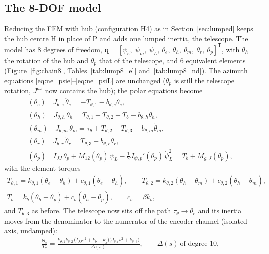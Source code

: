 \documentclass[10pt,a4paper]{article}
\numberwithin{equation}{section}
\begin{document}
\subsection{The 8-DOF model}\label{subsec:8dof}
Reducing the FEM with hub (configuration H4) as in Section~\ref{sec:lumped} keeps the hub centre H in place of P and adds one lumped inertia, the telescope. The model has 8 degrees of freedom, $\mathbf q = [\psi_e,\ \psi_m,\ \psi_L,\ \theta_e,\ \theta_h,\ \theta_m,\ \theta_r,\ \theta_p]^{\mathsf T}$, with $\theta_h$ the rotation of the hub and $\theta_p$ that of the telescope, and 6 equivalent elements (Figure~\ref{fig:chain8}, Tables~\ref{tab:lump8_el} and~\ref{tab:lump8_nd}). The azimuth equations \eqref{eq:ne_psie}--\eqref{eq:ne_psiL} are unchanged ($\theta_p$ is still the telescope rotation, $J^{ax}$ now contains the hub); the polar equations become
\begin{gather}
(\theta_e)\quad J_{\theta,e}\,\ddot\theta_e = -T_{\theta,1} - b_{\theta,e}\dot\theta_e,\\
(\theta_h)\quad J_{\theta,h}\,\ddot\theta_h = T_{\theta,1} - T_{\theta,2} - T_b - b_{\theta,h}\dot\theta_h,\\
(\theta_m)\quad J_{\theta,m}\,\ddot\theta_m = \tau_\theta + T_{\theta,2} - T_{\theta,3} - b_{\theta,m}\dot\theta_m,\\
(\theta_r)\quad J_{\theta,r}\,\ddot\theta_r = T_{\theta,3} - b_{\theta,r}\dot\theta_r,\\
(\theta_p)\quad I_{JJ}\,\ddot\theta_p + M_{12}(\theta_p)\,\ddot\psi_L - \tfrac12 J_{\psi,p}'(\theta_p)\,\dot\psi_L^2 = T_b + M_{g,J}(\theta_p),
\end{gather}
with the element torques
\begin{gather}
T_{\theta,1} = k_{\theta,1}(\theta_e - \theta_h) + c_{\theta,1}(\dot\theta_e - \dot\theta_h),\qquad T_{\theta,2} = k_{\theta,2}(\theta_h - \theta_m) + c_{\theta,2}(\dot\theta_h - \dot\theta_m),\\
T_b = k_b(\theta_h - \theta_p) + c_b(\dot\theta_h - \dot\theta_p),\qquad c_b = \beta k_b,
\end{gather}
and $T_{\theta,3}$ as before. The telescope now sits off the path $\tau_\theta\to\theta_e$ and its inertia moves from the denominator to the numerator of the encoder channel (isolated axis, undamped):
\begin{gather}
\frac{\Theta_e}{T_\theta} = \frac{k_{\theta,1}k_{\theta,2}\,\bigl(I_{JJ}s^2 + k_b + k_g\bigr)\bigl(J_{\theta,r}s^2 + k_{\theta,3}\bigr)}{\Delta(s)},\qquad \Delta(s)\ \text{of degree 10},\label{eq:tf8}
\end{gather}
\end{document}
